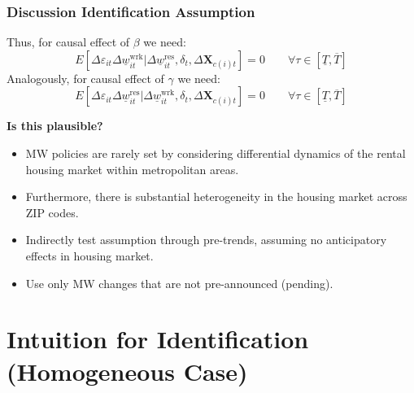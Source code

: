 \documentclass[aspectratio=169, t]{beamer}
\newcommand{\MW}{\underline{w}}
\begin{document}
\begin{frame}
	\frametitle{Discussion Identification Assumption}
	
	Thus, for causal effect of $\beta$ we need:
	$$
	E \left[\Delta \varepsilon_{it} \Delta \MW^{\text{wrk}}_{it}  
	\big| \Delta \MW^{\text{res}}_{it}, \delta_t, \Delta 
	\mathbf{X}_{c(i)t} \right] = 0
	\quad \quad \forall \tau \in \left[ \underline{T}, \overline{T} \right]
	$$
	\vspace{.5mm}
	Analogously, for causal effect of $\gamma$ we need:
	$$
	E \left[\Delta \varepsilon_{it} \Delta \MW^{\text{res}}_{it}  
	\big| \Delta \MW^{\text{wrk}}_{it}, \delta_t, \Delta \mathbf{X}_{c(i)t} 
	\right] = 0
	\quad \quad \forall \tau \in \left[ \underline{T}, \overline{T} \right]
	$$
	
	\pause
	\vspace{.5mm}
	\textbf{Is this plausible?}
	\begin{itemize} \small
		\vspace{.5mm}
		\item MW policies are rarely set by considering differential dynamics of the 
		rental housing market within metropolitan areas.
		
		\vspace{.5mm}
		\item Furthermore, there is substantial heterogeneity in the housing market 
		across ZIP codes.
		
		\vspace{.5mm}
		\item Indirectly test assumption through pre-trends, assuming no anticipatory 
		effects in housing market.
		
		\vspace{.5mm}
		\item Use only MW changes that are not pre-announced (pending).
	\end{itemize}
\end{frame}

\section {Intuition for Identification (Homogeneous Case)}
\end{document}
